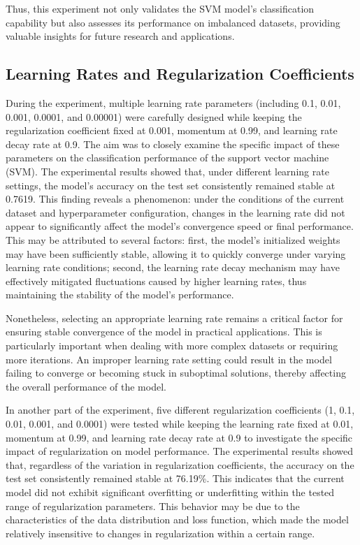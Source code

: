 \documentclass[a4paper, utf8]{ctexart}
\begin{document}
	Thus, this experiment not only validates the SVM model's classification capability but also assesses its performance on imbalanced datasets, providing valuable insights for future research and applications.
	
	\subsection{Learning Rates and Regularization Coefficients}
	
	During the experiment, multiple learning rate parameters (including 0.1, 0.01, 0.001, 0.0001, and 0.00001) were carefully designed while keeping the regularization coefficient fixed at 0.001, momentum at 0.99, and learning rate decay rate at 0.9. The aim was to closely examine the specific impact of these parameters on the classification performance of the support vector machine (SVM). The experimental results showed that, under different learning rate settings, the model's accuracy on the test set consistently remained stable at 0.7619. This finding reveals a phenomenon: under the conditions of the current dataset and hyperparameter configuration, changes in the learning rate did not appear to significantly affect the model's convergence speed or final performance. This may be attributed to several factors: first, the model's initialized weights may have been sufficiently stable, allowing it to quickly converge under varying learning rate conditions; second, the learning rate decay mechanism may have effectively mitigated fluctuations caused by higher learning rates, thus maintaining the stability of the model's performance.
	
	Nonetheless, selecting an appropriate learning rate remains a critical factor for ensuring stable convergence of the model in practical applications. This is particularly important when dealing with more complex datasets or requiring more iterations. An improper learning rate setting could result in the model failing to converge or becoming stuck in suboptimal solutions, thereby affecting the overall performance of the model.
	
	In another part of the experiment, five different regularization coefficients (1, 0.1, 0.01, 0.001, and 0.0001) were tested while keeping the learning rate fixed at 0.01, momentum at 0.99, and learning rate decay rate at 0.9 to investigate the specific impact of regularization on model performance. The experimental results showed that, regardless of the variation in regularization coefficients, the accuracy on the test set consistently remained stable at 76.19\%. This indicates that the current model did not exhibit significant overfitting or underfitting within the tested range of regularization parameters. This behavior may be due to the characteristics of the data distribution and loss function, which made the model relatively insensitive to changes in regularization within a certain range.
	
\end{document}
